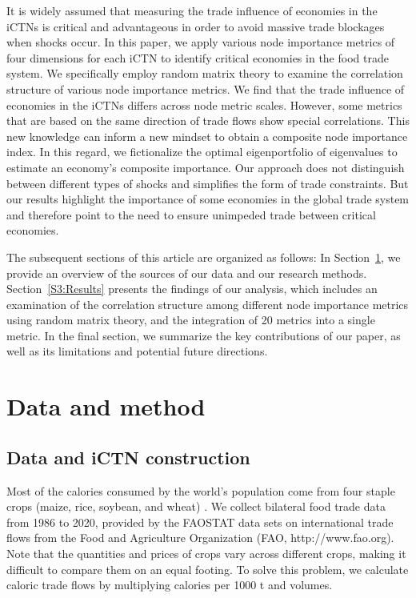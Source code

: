 \documentclass[preprint,3p,times,sort&compress]{elsarticle}
\begin{document}
It is widely assumed that measuring the trade influence of economies in the iCTNs is critical and advantageous in order to avoid massive trade blockages when shocks occur. In this paper, we apply various node importance metrics of four dimensions for each iCTN to identify critical economies in the food trade system. We specifically employ random matrix theory to examine the correlation structure of various node importance metrics. We find that the trade influence of economies in the iCTNs differs across node metric scales. However, some metrics that are based on the same direction of trade flows show special correlations. This new knowledge can inform a new mindset to obtain a composite node importance index. In this regard, we fictionalize the optimal eigenportfolio of eigenvalues to estimate an economy's composite importance. Our approach does not distinguish between different types of shocks and simplifies the form of trade constraints. But our results highlight the importance of some economies in the global trade system and therefore point to the need to ensure unimpeded trade between critical economies.


The subsequent sections of this article are organized as follows: In Section~\ref{S2:DataMethod}, we provide an overview of the sources of our data and our research methods. Section~\ref{S3:Results} presents the findings of our analysis, which includes an examination of the correlation structure among different node importance metrics using random matrix theory, and the integration of 20 metrics into a single metric. In the final section, we summarize the key contributions of our paper, as well as its limitations and potential future directions.


\section{Data and method}
\label{S2:DataMethod}



\subsection{Data and iCTN construction}


Most of the calories consumed by the world's population come from four staple crops (maize, rice, soybean, and wheat) \cite{DOdorico-Carr-Laio-Ridolfi-Vandoni-2014-EarthFuture}. We collect bilateral food trade data from 1986 to 2020, provided by the FAOSTAT data sets on international trade flows from the Food and Agriculture Organization (FAO, http://www.fao.org). Note that the quantities and prices of crops vary across different crops, making it difficult to compare them on an equal footing. To solve this problem, we calculate caloric trade flows by multiplying calories per 1000 t and volumes.
\end{document}
